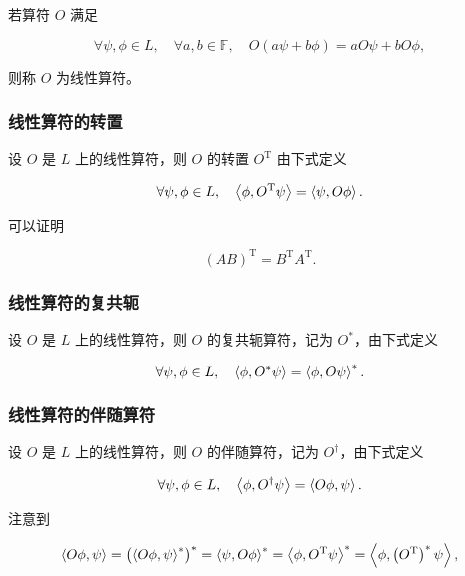 若算符 $O $ 满足

\begin{equation}
\forall \psi,\phi \in L,\quad\forall a,b\in \mathbb{F},\quad
O(a \psi + b \phi)
=a O \psi + b O \phi,
\end{equation}

则称 $O $ 为线性算符。

\subsubsection{线性算符的转置}

设 $O $ 是 $L $ 上的线性算符，则 $O $ 的转置 $O^\mathrm{T} $ 由下式定义

\begin{equation}
\forall \psi,\phi \in L,\quad
\Braket{\phi , O^\mathrm{T} \psi }
=\Braket{\psi , O \phi }.
\end{equation}

可以证明

\begin{equation}
\left(A B \right)^\mathrm{T}
=B^\mathrm{T} A^\mathrm{T}.
\end{equation}

\subsubsection{线性算符的复共轭}

设 $O $ 是 $L $ 上的线性算符，则 $O $ 的复共轭算符，记为 $O^* $，由下式定义

\begin{equation}
\forall \psi,\phi\in L,\quad
\Braket{\phi , O^* \psi }
=\Braket{\phi , O \psi }^*.
\end{equation}

\subsubsection{线性算符的伴随算符}

设 $O $ 是 $L $ 上的线性算符，则 $O $ 的伴随算符，记为 $O^\dag $，由下式定义

\begin{equation}
\forall \psi,\phi\in L,\quad
\Braket{\phi , O^\dag \psi }
=\Braket{O \phi , \psi }.
\end{equation}

注意到

\begin{equation}
\Braket{O \phi , \psi }
=\left(\Braket{O \phi , \psi }^* \right)^*
=\Braket{\psi , O \phi }^*
=\Braket{\phi , O^\mathrm{T} \psi }^*
=\Braket{\phi , \left(O^\mathrm{T} \right)^* \psi },
\end{equation}

